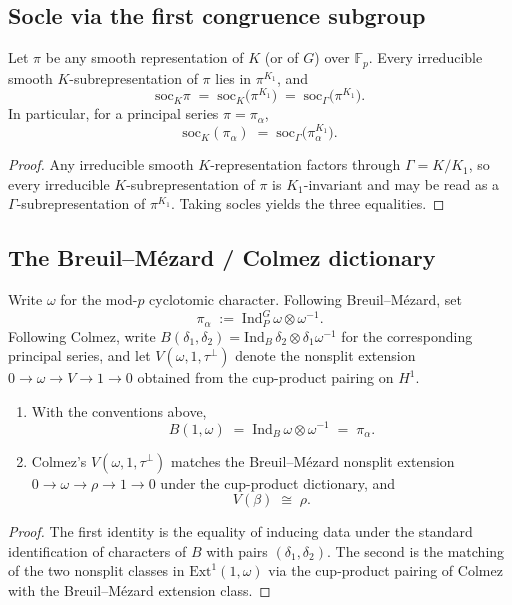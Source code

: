 \subsection{Socle via the first congruence subgroup}
\begin{theorem}\label{thm:soc-k1}
Let $\pi$ be any smooth representation of $K$ (or of $G$) over $\mathbb{F}_p$. Every irreducible smooth $K$-subrepresentation of $\pi$ lies in $\pi^{K_1}$, and
\[
\mathrm{soc}_K\pi \;=\; \mathrm{soc}_K\bigl(\pi^{K_1}\bigr) \;=\; \mathrm{soc}_\Gamma\bigl(\pi^{K_1}\bigr).
\]
In particular, for a principal series $\pi=\pi_\alpha$,
\[
\mathrm{soc}_K(\pi_\alpha)\;=\;\mathrm{soc}_\Gamma\bigl(\pi_\alpha^{K_1}\bigr).
\]
\end{theorem}
\begin{proof}
Any irreducible smooth $K$-representation factors through $\Gamma=K/K_1$, so every irreducible $K$-subrepresentation of $\pi$ is $K_1$-invariant and may be read as a $\Gamma$-subrepresentation of $\pi^{K_1}$. Taking socles yields the three equalities.
\end{proof}

\subsection{The Breuil--M\'ezard / Colmez dictionary}
Write $\omega$ for the mod-$p$ cyclotomic character. Following Breuil--M\'ezard, set
\[
\pi_\alpha \;:=\; \mathrm{Ind}_P^G\,\omega\otimes\omega^{-1}.
\]
Following Colmez, write $B(\delta_1,\delta_2)=\mathrm{Ind}_B\,\delta_2\otimes\delta_1\omega^{-1}$ for the corresponding principal series, and let $V(\omega,1,\tau^\perp)$ denote the nonsplit extension $0\to\omega\to V\to 1\to0$ obtained from the cup-product pairing on $H^1$.

\begin{theorem}\label{thm:colmez-d12}
\begin{enumerate}
\item With the conventions above,
\[
B(1,\omega)\;=\;\mathrm{Ind}_B\,\omega\otimes\omega^{-1}\;=\;\pi_\alpha.
\]
\item Colmez's $V(\omega,1,\tau^\perp)$ matches the Breuil--M\'ezard nonsplit extension $0\to\omega\to\rho\to1\to0$ under the cup-product dictionary, and
\[
V(\beta)\;\cong\;\rho.
\]
\end{enumerate}
\end{theorem}
\begin{proof}
The first identity is the equality of inducing data under the standard identification of characters of $B$ with pairs $(\delta_1,\delta_2)$. The second is the matching of the two nonsplit classes in $\mathrm{Ext}^1(1,\omega)$ via the cup-product pairing of Colmez with the Breuil--M\'ezard extension class.
\end{proof}

